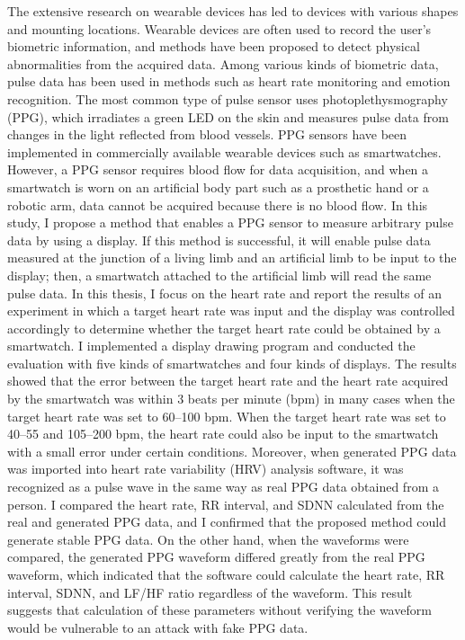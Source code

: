 \documentclass[uplatex, 12pt, papersize, openany, dvipdfmx]{jsbook}
\begin{document}

\thesisKind{\MasterThesis} %




  The extensive research on wearable devices has led to devices with various shapes and mounting locations. Wearable devices are often used to record the user's biometric information, and methods have been proposed to detect physical abnormalities from the acquired data. Among various kinds of biometric data, pulse data has been used in methods such as heart rate monitoring and emotion recognition. The most common type of pulse sensor uses photoplethysmography (PPG), which irradiates a green LED on the skin and measures pulse data from changes in the light reflected from blood vessels. PPG sensors have been implemented in commercially available wearable devices such as smartwatches. However, a PPG sensor requires blood flow for data acquisition, and when a smartwatch is worn on an artificial body part such as a prosthetic hand or a robotic arm, data cannot be acquired because there is no blood flow. In this study, I propose a method that enables a PPG sensor to measure arbitrary pulse data by using a display. If this method is successful, it will enable pulse data measured at the junction of a living limb and an artificial limb to be input to the display; then, a smartwatch attached to the artificial limb will read the same pulse data. In this thesis, I focus on the heart rate and report the results of an experiment in which a target heart rate was input and the display was controlled accordingly to determine whether the target heart rate could be obtained by a smartwatch. I implemented a display drawing program and conducted the evaluation with five kinds of smartwatches and four kinds of displays. The results showed that the error between the target heart rate and the heart rate acquired by the smartwatch was within $3$ beats per minute (bpm) in many cases when the target heart rate was set to 60--100 bpm. When the target heart rate was set to 40--55 and 105--200 bpm, the heart rate could also be input to the smartwatch with a small error under certain conditions. Moreover, when generated PPG data was imported into heart rate variability (HRV) analysis software, it was recognized as a pulse wave in the same way as real PPG data obtained from a person. I compared the heart rate, RR interval, and SDNN calculated from the real and generated PPG data, and I confirmed that the proposed method could generate stable PPG data. On the other hand, when the waveforms were compared, the generated PPG waveform differed greatly from the real PPG waveform, which indicated that the software could calculate the heart rate, RR interval, SDNN, and LF/HF ratio regardless of the waveform. This result suggests that calculation of these parameters without verifying the waveform would be vulnerable to an attack with fake PPG data.
\end{document}
